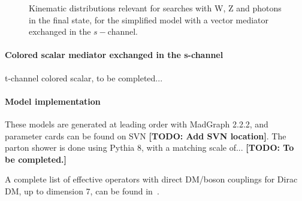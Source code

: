 \begin{figure}[h!]
{    }    
    \hfill
    \caption{Kinematic distributions relevant for searches with W, Z and photons in the final state, 
    for the simplified model with a vector mediator exchanged in the $s-$channel.}
    \label{fig:DMV_EW_kinematics}
\end{figure}

\paragraph{Colored scalar mediator exchanged in the s-channel}

t-channel colored scalar, to be completed...

\paragraph{Model implementation}

These models are generated at leading order with MadGraph 2.2.2, and parameter
cards can be found on SVN \textbf{[TODO: Add SVN location]}.
The parton shower is done using Pythia 8, with a matching scale of... 
\textbf{[TODO: To be completed.]}


A complete list of effective operators with direct DM/boson couplings for
Dirac DM, up to dimension 7, can be found in~\cite{Cotta:2012nj}. 

